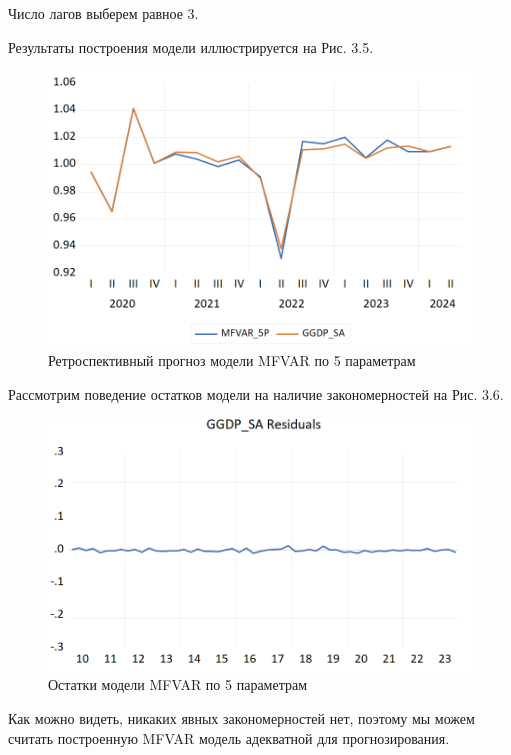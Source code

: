 \documentclass[a4paper, 14pt]{extreport}
\numberwithin{equation}{subsection}
\numberwithin{equation}{section}
\begin{document}
	Число лагов выберем равное 3.
	
	Результаты построения модели
	иллюстрируется на Рис. 3.5.
	
	\begin{figure}[h]
		\centering
		\includegraphics[scale=0.45]{images/img19}
		\caption{Ретроспективный прогноз модели MFVAR по 5 параметрам}
		\label{fig:img19}
	\end{figure}
	
	Рассмотрим поведение остатков модели на наличие закономерностей на Рис. 3.6.
	
	\begin{figure}[h!]
		\centering
		\includegraphics[scale=0.45]{images/img20}
		\caption{Остатки модели MFVAR по 5 параметрам}
		\label{fig:img20}
	\end{figure}
	
	Как можно видеть, никаких явных закономерностей нет, поэтому мы можем считать построенную MFVAR модель адекватной для прогнозирования.
	
\end{document}
